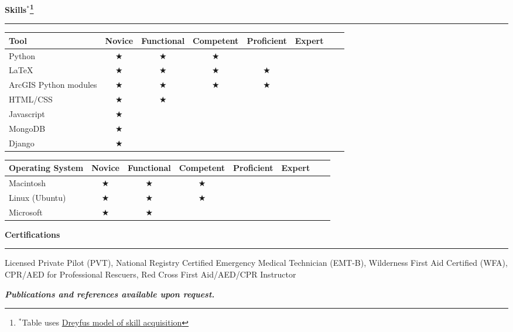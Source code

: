 \documentclass[11pt]{article}
\begin{document}
\smallskip
\vspace*{0.25 mm}
\textbf{Skills$^{*}$\let\thefootnote\relax\footnote{$^{*}$Table uses \href{https://en.wikipedia.org/wiki/Dreyfus\_model\_of\_skill\_acquisition\#The\_original\_five-stage\_model}{Dreyfus model of skill acquisition}}}
\smallskip
\hrule

\begin{table}[h]
\begin{tabular}{l*{6}{c}r}
Tool      & Novice & Functional & Competent & Proficient & Expert \\
\hline
Python & $\bigstar$ & $\bigstar$ & $\bigstar$ &  &   \\
\LaTeX            & $\bigstar$ & $\bigstar$ & $\bigstar$ & $\bigstar$ &   \\
ArcGIS Python modules           & $\bigstar$ & $\bigstar$ & $\bigstar$ & $\bigstar$ &   \\
HTML/CSS     & $\bigstar$ & $\bigstar$ &  &  &   \\
Javascript     & $\bigstar$ &  &  &  &   \\
MongoDB     & $\bigstar$ &  &  &  &   \\
Django     & $\bigstar$ &  &  &  &   \\
\end{tabular} 
\end{table} 


\begin{table}[h]
\begin{tabular}{l*{6}{c}r}
Operating System      \hspace*{10 mm}& Novice & Functional & Competent & Proficient & Expert \\
\hline
Macintosh & $\bigstar$ & $\bigstar$ & $\bigstar$ &  &  \\
Linux (Ubuntu)            & $\bigstar$ & $\bigstar$ & $\bigstar$ &  &   \\
Microsoft           & $\bigstar$ & $\bigstar$ &  &  &   \\
\end{tabular}
\end{table}  

\vspace*{0.25 mm}
\textbf{Certifications}
\smallskip
\hrule  
Licensed Private Pilot (PVT), National Registry Certified Emergency Medical Technician (EMT-B), Wilderness First Aid Certified (WFA), CPR/AED for Professional Rescuers, Red Cross First Aid/AED/CPR Instructor%

\smallskip
\emph{\textbf{Publications and references available upon request.}}
\end{document}
